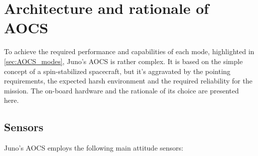 \section{Architecture and rationale of AOCS}
\label{sec:AOCS_architecture_rationale}

To achieve the required performance and capabilities of each mode, highlighted in \autoref{sec:AOCS_modes}, Juno's AOCS is rather complex. It is based on the simple concept of a spin-stabilized spacecraft, but it's aggravated by the pointing requirements, the expected harsh environment and the required reliability for the mission. The on-board hardware and the rationale of its choice are presented here.     

\subsection{Sensors}
\label{subsec:Sensors}

Juno's AOCS employs the following main attitude sensors:

